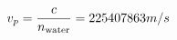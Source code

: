\documentclass[preview]{standalone}
\begin{document}
\begin{align*}
\special{dvisvgm:raw <g id='unique000'>}v_p = \frac{c}{n_{\text{water}}} = 225407863 m/s\special{dvisvgm:raw </g>}
\end{align*}
\end{document}
